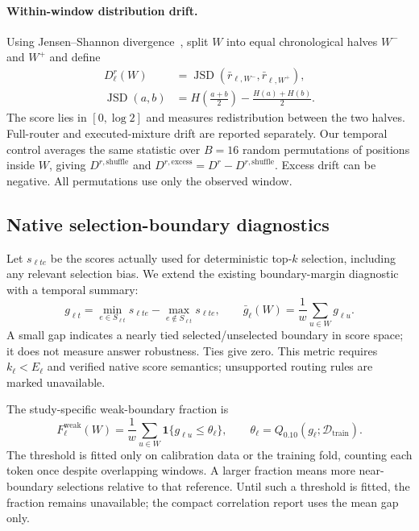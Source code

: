 \paragraph{Within-window distribution drift.}
Using Jensen--Shannon divergence~\cite{newmetrics_lin1991}, split $W$ into equal
chronological halves $W^-$ and $W^+$ and define
\begin{align}
 D^r_\ell(W)&=\operatorname{JSD}(\bar r_{\ell,W^-},\bar r_{\ell,W^+}),\nonumber\\
 \operatorname{JSD}(a,b)&=H\!\left(\frac{a+b}{2}\right)
                        -\frac{H(a)+H(b)}{2}.
 \label{eq:new-jsd}
\end{align}
The score lies in $[0,\log2]$ and measures redistribution between the two halves.
Full-router and executed-mixture drift are reported separately. Our temporal
control averages the same statistic over $B=16$ random permutations of positions
inside $W$, giving $D^{r,\mathrm{shuffle}}$ and
$D^{r,\mathrm{excess}}=D^r-D^{r,\mathrm{shuffle}}$.
Excess drift can be negative. All permutations use only the observed window.

\subsection{Native selection-boundary diagnostics}

Let $s_{\ell te}$ be the scores actually used for deterministic top-$k$
selection, including any relevant selection bias. We extend the existing
boundary-margin diagnostic with a temporal summary:
\begin{equation}
 g_{\ell t}=\min_{e\in S_{\ell t}}s_{\ell te}
            -\max_{e\notin S_{\ell t}}s_{\ell te},
 \qquad \bar g_\ell(W)=\frac{1}{w}\sum_{u\in W}g_{\ell u}.
 \label{eq:new-boundary}
\end{equation}
A small gap indicates a nearly tied selected/unselected boundary in score space;
it does not measure answer robustness. Ties give zero. This metric requires
$k_\ell<E_\ell$ and verified native score semantics; unsupported routing rules
are marked unavailable.

The study-specific weak-boundary fraction is
\begin{equation}
 F^{\mathrm{weak}}_\ell(W)=\frac{1}{w}
 \sum_{u\in W}\mathbf{1}\{g_{\ell u}\leq\theta_\ell\},
 \qquad \theta_\ell=Q_{0.10}(g_\ell;\mathcal D_{\mathrm{train}}).
 \label{eq:new-weak-boundary}
\end{equation}
The threshold is fitted only on calibration data or the training fold, counting
each token once despite overlapping windows. A larger fraction means more
near-boundary selections relative to that reference. Until such a threshold is
fitted, the fraction remains unavailable; the compact correlation report uses
the mean gap only.

